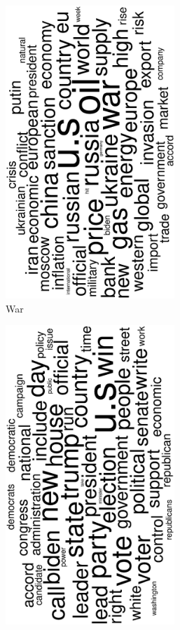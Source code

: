 \begin{figure}
\begin{subfigure}{0.32\textwidth}
		\includegraphics[width=0.7\textwidth,angle=270]{figures/wordcloud2.eps}
		\caption{War}
	\end{subfigure}
	\begin{subfigure}{0.32\textwidth}
		\includegraphics[width=0.7\textwidth,angle=270]{figures/wordcloud11.eps}

\end{subfigure}
\end{figure}
